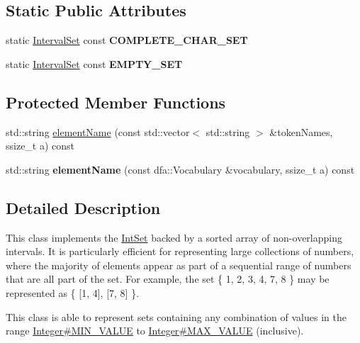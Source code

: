 \subsection*{Static Public Attributes}
\begin{DoxyCompactItemize}
\item 
static \hyperlink{classantlr4_1_1misc_1_1IntervalSet}{Interval\+Set} const {\bfseries C\+O\+M\+P\+L\+E\+T\+E\+\_\+\+C\+H\+A\+R\+\_\+\+S\+ET}
\item 
\mbox{\label{classantlr4_1_1misc_1_1IntervalSet_a7bdf62c1c0de87491c5044a42c6adfcd}} 
static \hyperlink{classantlr4_1_1misc_1_1IntervalSet}{Interval\+Set} const {\bfseries E\+M\+P\+T\+Y\+\_\+\+S\+ET}
\end{DoxyCompactItemize}
\subsection*{Protected Member Functions}
\begin{DoxyCompactItemize}
\item 
std\+::string \hyperlink{classantlr4_1_1misc_1_1IntervalSet_a10334d09c666f59ced45f43b9cd2772a}{element\+Name} (const std\+::vector$<$ std\+::string $>$ \&token\+Names, ssize\+\_\+t a) const
\item 
\mbox{\label{classantlr4_1_1misc_1_1IntervalSet_a996d85ad96aa8f7f38a394ee6c340fc5}} 
std\+::string {\bfseries element\+Name} (const dfa\+::\+Vocabulary \&vocabulary, ssize\+\_\+t a) const
\end{DoxyCompactItemize}


\subsection{Detailed Description}
This class implements the \hyperlink{}{Int\+Set} backed by a sorted array of non-\/overlapping intervals. It is particularly efficient for representing large collections of numbers, where the majority of elements appear as part of a sequential range of numbers that are all part of the set. For example, the set \{ 1, 2, 3, 4, 7, 8 \} may be represented as \{ \mbox{[}1, 4\mbox{]}, \mbox{[}7, 8\mbox{]} \}.

This class is able to represent sets containing any combination of values in the range \hyperlink{}{Integer\#\+M\+I\+N\+\_\+\+V\+A\+L\+UE} to \hyperlink{}{Integer\#\+M\+A\+X\+\_\+\+V\+A\+L\+UE} (inclusive).


